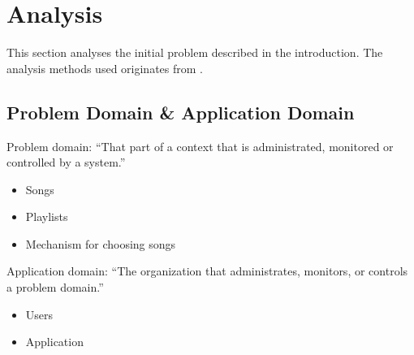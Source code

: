\chapter{Analysis}

This section analyses the initial problem described in the introduction. The analysis methods used originates from \cite{mathiassen2001objektorienteret}. 

\section{Problem Domain \& Application Domain}

Problem domain: \enquote{That part of a context that is administrated, monitored or controlled by a system.}


\begin{itemize}
  \item Songs
  \item Playlists
  \item Mechanism for choosing songs
\end{itemize}

Application domain: \enquote{The organization that administrates, monitors, or controls a problem domain.}

\begin{itemize}
  \item Users
  \item Application
\end{itemize}
